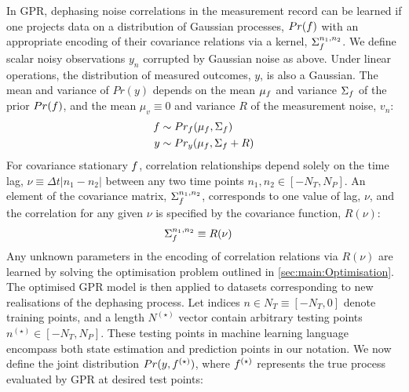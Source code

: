 In GPR, dephasing noise correlations in the measurement record can be learned if one projects data on a distribution of Gaussian processes, $Pr(f)$ with an appropriate encoding of their covariance relations via a kernel, $\Sigma_f^{n_1, n_2}$. We define scalar noisy observations $y_{n}$ corrupted by Gaussian noise as above.  %
Under linear operations, the distribution of measured outcomes, $y$, is also a Gaussian. The  mean and variance of $Pr(y)$  depends on the mean $\mu_f$ and variance $\Sigma_f$ of the prior $Pr(f)$, and the mean $\mu_v \equiv 0$ and variance $R$ of the measurement noise, $v_n$: 
\begin{align}
f & \sim Pr_f(\mu_f,\Sigma_f ) \\
y & \sim Pr_y(\mu_f,\Sigma_f + R ) 
\end{align}
For covariance stationary $f$, correlation relationships depend solely on the time lag, $\nu \equiv \Delta t|n_1 - n_2|$ between any two time points  $n_1, n_2 \in [-N_T, N_P]$.  An element of the covariance matrix, $\Sigma_f^{n_1,n_2}$, corresponds to one value of lag, $\nu$, and the correlation for any given $\nu$  is specified by the covariance function, $R(\nu)$:
\begin{align}
\Sigma_f^{n_1,n_2} & \equiv R(\nu) 
\end{align}
Any unknown parameters in the encoding of correlation relations via $R(\nu)$ are learned by solving the optimisation problem outlined in \cref{sec:main:Optimisation}. The optimised GPR model is then applied to datasets corresponding to new realisations of the dephasing process. Let indices $n \in N_T \equiv [-N_T, 0]$ denote training points, and a length $N^{(\star)} $ vector contain arbitrary testing points $n^{(\star)} \in [-N_T, N_P]$. These testing points in machine learning language encompass both state estimation and prediction points in our notation. We now define the joint distribution $Pr(y,f^{(\star)})$, where $f^{(\star)}$ represents the true process evaluated by GPR at desired test points: 

